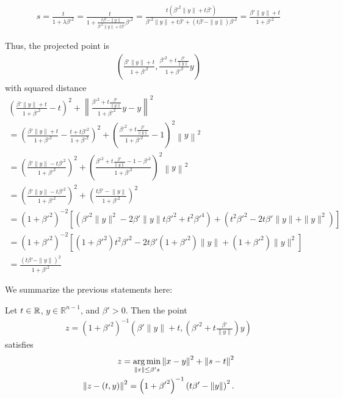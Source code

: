 \begin{align*}
s = \frac {t}{1 + \lambda{\beta'}^2 } 
= \frac {t}{1 +\frac{t{\beta'} - \|y\|}{{\beta'}^2\|y\| + t{\beta'}}{\beta'}^2 } 
= \frac {t\left({\beta'}^2\|y\| + t{\beta'}\right)}{{\beta'}^2\|y\| + t{\beta'} + \left(t{\beta'} - \|y\|\right){\beta'}^2 } 
= \frac {{\beta'}\|y\| + t}{1 + {\beta'}^2 } 
\end{align*}


Thus, the projected point is
\begin{align*}
\left(\frac{{\beta'} \|y\| + t}{1 + {\beta'} ^ 2}, \frac{{\beta'} ^ 2 + t \frac {{\beta'}}{\|y\|}}{1 + {\beta'} ^ 2}y\right)
\end{align*}
with squared distance
\begin{align*}
\left(\frac{{\beta'} \|y\| + t}{1 + {\beta'} ^ 2} - t\right)^2 + \left\|\frac{{\beta'} ^ 2 + t \frac {{\beta'}}{\|y\|}}{1 + {\beta'} ^ 2}y - y\right\|^2 \\
= \left(\frac{{\beta'} \|y\| + t}{1 + {\beta'} ^ 2} - \frac{t + t{\beta'} ^ 2}{1 + {\beta'} ^ 2}\right)^2 + \left(\frac{{\beta'} ^ 2 + t \frac {{\beta'}}{\|y\|}}{1 + {\beta'} ^ 2} - 1\right)^2\left\|y\right\|^2 \\
= \left(\frac{{\beta'} \|y\| - t{\beta'}^2}{1 + {\beta'} ^ 2}\right)^2 + \left(\frac{{\beta'} ^ 2 + t \frac {{\beta'}}{\|y\|} - 1 - {\beta'} ^ 2}{1 + {\beta'} ^ 2}\right)^2\left\|y\right\|^2 \\
= \left(\frac{{\beta'} \|y\| - t{\beta'}^2}{1 + {\beta'} ^ 2}\right)^2 + \left(\frac{t {\beta'} - \left\|y\right\|}{1 + {\beta'} ^ 2}\right)^2 \\
= \left(1 + {\beta'}^2\right)^{-2}\left[\left({\beta'}^2 \|y\|^2 - 2\beta' \|y\| t {\beta'}^2  + t^2 {\beta'}^4\right) + \left(t^2{\beta'}^2 - 2 t {\beta'} \|y\| + \|y\|^2\right) \right] \\
= \left(1 + {\beta'}^2\right)^{-2}\left[
\left(1 + {\beta'}^2\right)t^2{\beta'}^2 - 2t{\beta'}\left(1 + {\beta'}^2\right) \|y\| + \left(1 + {\beta'}^2\right)\|y\|^2
\right] \\
= \frac{\left(t \beta' - \|y\|\right)^2}{1 + {\beta'}^2}
\end{align*}

We summarize the previous statements here:
\begin{lemma}
Let $t \in \mathbb R$, $y \in \mathbb R^{n-1}$, and $\beta' > 0$.
Then the point
\begin{align*}
z = \left(1 + {\beta'} ^ 2\right)^{-1} \left({\beta'} \|y\| + t, \left({\beta'} ^ 2 + t \frac {{\beta'}}{\|y\|}\right) y\right)
\end{align*}
satisfies
\begin{align*}
z = \operatorname*{arg\,min}_{\left\|x\right\| \le \beta' s} \left\|x - y\right\|^2 + \left\|s - t\right\|^2 \\
\left\|z - (t, y)\right\|^2 = \left(1 + {\beta'}^2\right)^{-1}\left(t \beta' - \left\|y\right\| \right)^2.
\end{align*}
\end{lemma}

